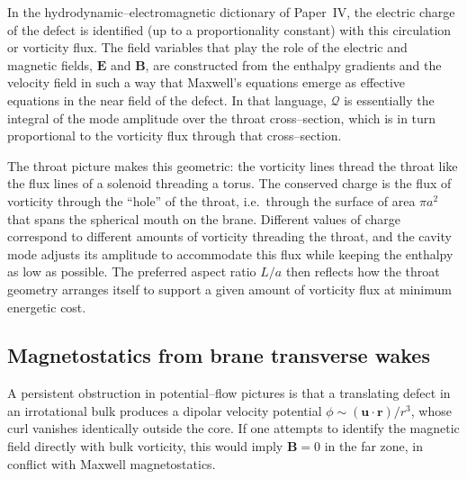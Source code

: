 \documentclass[12pt]{article}
\begin{document}
In the hydrodynamic--electromagnetic dictionary of Paper~IV, the electric
charge of the defect is identified (up to a proportionality constant) with
this circulation or vorticity flux.  The field variables that play the role
of the electric and magnetic fields, $\mathbf{E}$ and $\mathbf{B}$, are
constructed from the enthalpy gradients and the velocity field in such a way
that Maxwell's equations emerge as effective equations in the near field of
the defect.  In that language, $\mathcal{Q}$ is essentially the integral of
the mode amplitude over the throat cross--section, which is in turn
proportional to the vorticity flux through that cross--section.

The throat picture makes this geometric: the vorticity lines thread the
throat like the flux lines of a solenoid threading a torus.  The conserved
charge is the flux of vorticity through the ``hole'' of the throat, i.e.\ 
through the surface of area $\pi a^2$ that spans the spherical mouth on the
brane.  Different values of charge correspond to different amounts of
vorticity threading the throat, and the cavity mode adjusts its amplitude to
accommodate this flux while keeping the enthalpy as low as possible.  The
preferred aspect ratio $L/a$ then reflects how the throat geometry arranges
itself to support a given amount of vorticity flux at minimum energetic
cost.


\subsection{Magnetostatics from brane transverse wakes}
\label{subsec:brane_magnetostatics}

A persistent obstruction in potential--flow pictures is that a translating
defect in an irrotational bulk produces a dipolar velocity potential
$\phi\sim (\mathbf{u}\cdot \mathbf{r})/r^3$, whose curl vanishes identically
outside the core.  If one attempts to identify the magnetic field directly
with bulk vorticity, this would imply $\mathbf{B}=0$ in the far zone, in
conflict with Maxwell magnetostatics.
\end{document}
